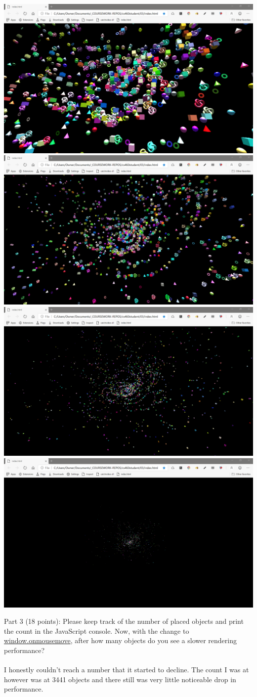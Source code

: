 \documentclass[10pt,oneside,onecolumn,letterpaper]{article}
\begin{document}
\begin{center}
    \includegraphics[width=.5\textwidth]{gfx/shape-galaxy-screenshot-1.png}
    \includegraphics[width=.5\textwidth]{gfx/shape-galaxy-screenshot-2.png}
    \includegraphics[width=.5\textwidth]{gfx/shape-galaxy-screenshot-3.png}
    \includegraphics[width=.5\textwidth]{gfx/shape-galaxy-screenshot-4.png}
\end{center}

\vspace{2cm} %

\noindent Part 3 (18 points): Please keep track of the number of placed objects and print the count in the JavaScript console. Now, with the change to \url{window.onmousemove}, after how many objects do you see a slower rendering performance? 
\\~\\
\noindent I honestly couldn't reach a number that it started to decline. The count I was at however was at 3441 objects and there still was very little noticeable drop in performance.
\end{document}
